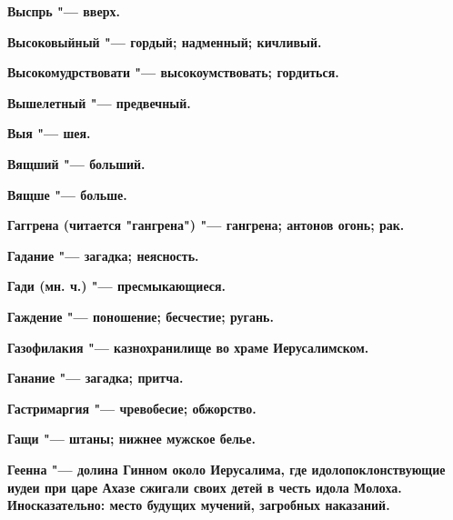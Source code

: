 \bfseries Выспрь \normalfont{} "--- вверх. 




\bfseries Высоковыйный \normalfont{} "--- гордый; надменный; кичливый. 




\bfseries Высокомудрствовати \normalfont{} "--- высокоумствовать; гордиться. 




\bfseries Вышелетный \normalfont{} "--- предвечный. 




\bfseries Выя \normalfont{} "--- шея. 




\bfseries Вящший \normalfont{} "--- больший. 




\bfseries Вящше \normalfont{} "--- больше. 




 





\bfseries Гаггрена \normalfont{} (читается "гангрена") "--- гангрена; антонов огонь; рак. 




\bfseries Гадание \normalfont{} "--- загадка; неясность. 




\bfseries Гади \normalfont{} (мн. ч.) "--- пресмыкающиеся. 




\bfseries Гаждение \normalfont{} "--- поношение; бесчестие; ругань. 




\bfseries Газофилакия \normalfont{} "--- казнохранилище во храме Иерусалимском. 




\bfseries Ганание \normalfont{} "--- загадка; притча. 




\bfseries Гастримаргия \normalfont{} "--- чревобесие; обжорство. 




\bfseries Гащи \normalfont{} "--- штаны; нижнее мужское белье. 




\bfseries Геенна \normalfont{} "--- долина Гинном около Иерусалима, где идолопоклонствующие иудеи при царе Ахазе сжигали своих детей в честь идола Молоха. Иносказательно: место будущих мучений, загробных наказаний. 




